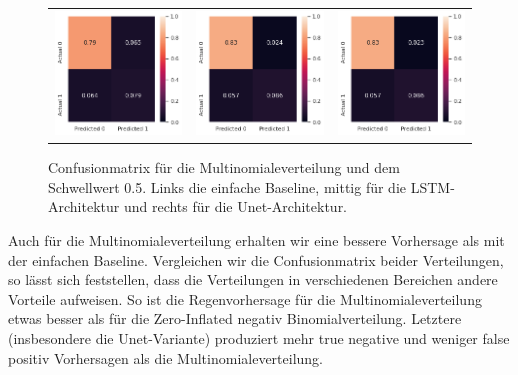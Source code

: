 \begin{figure}[h]
\begin{tabular}{ccc}
\includegraphics[width=45mm]{abb/simpleBaseLine.png}&
\includegraphics[width=45mm]{abb/categoricalConfusion_LSTM.png}&
\includegraphics[width=45mm]{abb/categoricalConfusion_UNET.png}
\end{tabular}
\caption{Confusionmatrix für die Multinomialeverteilung und dem Schwellwert 0.5. Links die einfache Baseline, mittig für die LSTM-Architektur und rechts für die Unet-Architektur. \label{fig:confusionmatrix_cat}}
\end{figure}

\noindent Auch für die Multinomialeverteilung erhalten wir eine bessere Vorhersage als mit der einfachen Baseline.
Vergleichen wir die Confusionmatrix beider Verteilungen, so lässt sich feststellen, dass die Verteilungen in verschiedenen Bereichen andere Vorteile aufweisen.
So ist die Regenvorhersage für die Multinomialeverteilung etwas besser als für die Zero-Inflated negativ Binomialverteilung. Letztere (insbesondere die Unet-Variante) produziert mehr true negative und weniger false positiv Vorhersagen als die Multinomialeverteilung.\\

